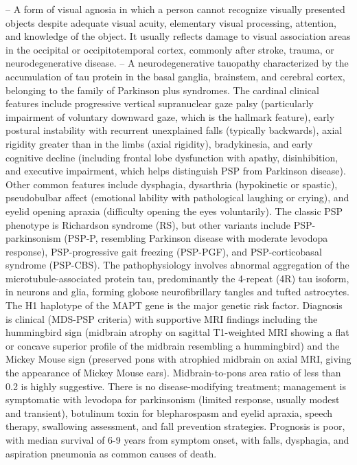 -- A form of visual agnosia in which a person cannot recognize visually presented objects despite adequate visual acuity, elementary visual processing, attention, and knowledge of the object. It usually reflects damage to visual association areas in the occipital or occipitotemporal cortex, commonly after stroke, trauma, or neurodegenerative disease.
-- A neurodegenerative tauopathy characterized by the accumulation of tau protein in the basal ganglia, brainstem, and cerebral cortex, belonging to the family of Parkinson plus syndromes. The cardinal clinical features include progressive vertical supranuclear gaze palsy (particularly impairment of voluntary downward gaze, which is the hallmark feature), early postural instability with recurrent unexplained falls (typically backwards), axial rigidity greater than in the limbs (axial rigidity), bradykinesia, and early cognitive decline (including frontal lobe dysfunction with apathy, disinhibition, and executive impairment, which helps distinguish PSP from Parkinson disease). Other common features include dysphagia, dysarthria (hypokinetic or spastic), pseudobulbar affect (emotional lability with pathological laughing or crying), and eyelid opening apraxia (difficulty opening the eyes voluntarily). The classic PSP phenotype is Richardson syndrome (RS), but other variants include PSP-parkinsonism (PSP-P, resembling Parkinson disease with moderate levodopa response), PSP-progressive gait freezing (PSP-PGF), and PSP-corticobasal syndrome (PSP-CBS). The pathophysiology involves abnormal aggregation of the microtubule-associated protein tau, predominantly the 4-repeat (4R) tau isoform, in neurons and glia, forming globose neurofibrillary tangles and tufted astrocytes. The H1 haplotype of the MAPT gene is the major genetic risk factor. Diagnosis is clinical (MDS-PSP criteria) with supportive MRI findings including the hummingbird sign (midbrain atrophy on sagittal T1-weighted MRI showing a flat or concave superior profile of the midbrain resembling a hummingbird) and the Mickey Mouse sign (preserved pons with atrophied midbrain on axial MRI, giving the appearance of Mickey Mouse ears). Midbrain-to-pons area ratio of less than 0.2 is highly suggestive. There is no disease-modifying treatment; management is symptomatic with levodopa for parkinsonism (limited response, usually modest and transient), botulinum toxin for blepharospasm and eyelid apraxia, speech therapy, swallowing assessment, and fall prevention strategies. Prognosis is poor, with median survival of 6-9 years from symptom onset, with falls, dysphagia, and aspiration pneumonia as common causes of death.
